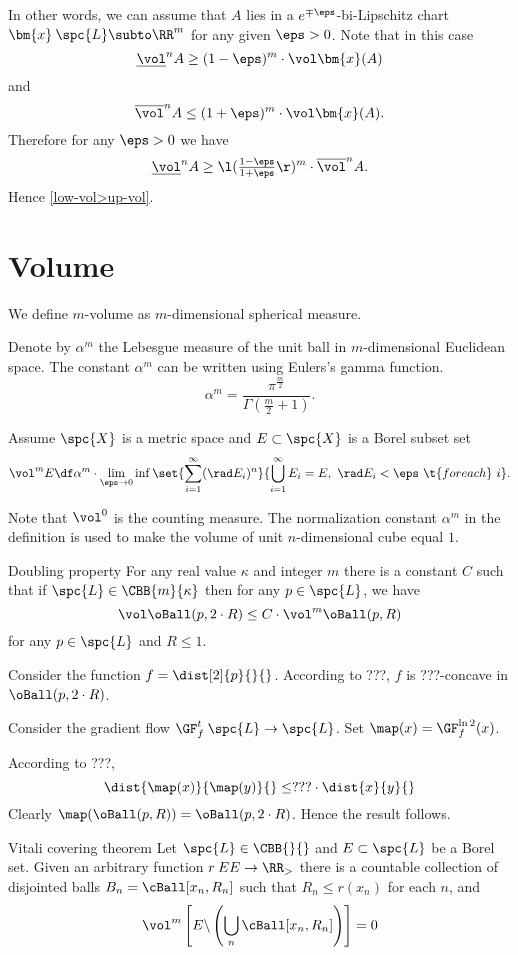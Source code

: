 In other words, we can assume that $A$ lies in a $e^{\mp\eps}$-bi-Lipschitz chart $\bm{x}\:\spc{L}\subto\RR^m$ for any given $\eps>0$.
Note that in this case
\[\underline\vol^n A\ge(1-\eps)^m\cdot\vol\bm{x}(A)\]
and
\[\overline\vol^n A\le(1+\eps)^m\cdot\vol\bm{x}(A).\]
Therefore for any $\eps>0$ we have
\[\underline\vol^n A
\ge
\l(\tfrac{1-\eps}{1+\eps}\r)^m\cdot\overline\vol^n A.\]
Hence \ref{low-vol>up-vol}.
\qeds

\section{Volume}

We define $m$-volume as $m$-dimensional spherical measure. 

Denote by $\alpha^m$ the Lebesgue measure of the unit ball 
in $m$-dimensional Euclidean space. 
The constant $\alpha^m$ can be written using Eulers's gamma function.
$$\alpha^m=\frac{\pi^{\frac m2}}{\Gamma(\frac m2+1)}.$$

Assume $\spc{X}$ is a metric space 
and $E\subset \spc{X}$ is a Borel subset set
\[\vol^m E
\df
\alpha^m
\cdot
\lim_{\eps\to0}\inf\set{\sum_{i=1}^\infty (\rad E_i)^n}{\bigcup_{i=1}^\infty E_i=E,\ \rad E_i<\eps\ \t{for each}\  i}.\]

Note that $\vol^0$ is the counting measure.
The normalization constant 
$\alpha^m$ 
in the definition is used to make the volume of unit $n$-dimensional cube equal $1$.

\begin{thm}{Doubling property}
For any real value $\kappa$ and integer $m$ there is a constant 
$C$ such that if $\spc{L}\in\CBB{m}{\kappa}$ then for any $p\in \spc{L}$, we have
$$\vol\oBall(p,2\cdot R)\le C\cdot \vol^m\oBall(p,R)$$
for any $p\in \spc{L}$ and $R\le 1$.
\end{thm}

Consider the function $f=\dist[2]{p}{}{}$.
According to ???, $f$ is ???-concave in $\oBall(p,2\cdot R)$.

Consider the gradient flow $\GF^t_f\:\spc{L}\to \spc{L}$.
Set $\map(x)=\GF^{\ln 2}_f(x)$.

According to ???, 
$$\dist{\map(x)}{\map(y)}{}\le ???\cdot\dist{x}{y}{}$$
Clearly $\map(\oBall(p, R))=\oBall(p,2\cdot R)$.
Hence the result follows.
\qeds

\begin{thm}{Vitali covering theorem}
Let $\spc{L}\in\CBB{}{}$ and $E\subset\spc{L}$ be a Borel set.
Given an arbitrary function $r\:EE\to \RR_>$ there is a countable collection of disjointed balls 
$B_n=\cBall[x_n,R_n]$ such that 
$R_n\le r(x_n)$ for each $n$,
and 
$$\vol^m\left[E\backslash \left(\bigcup_n\cBall[x_n,R_n]\right)\right]=0$$
\end{thm}


